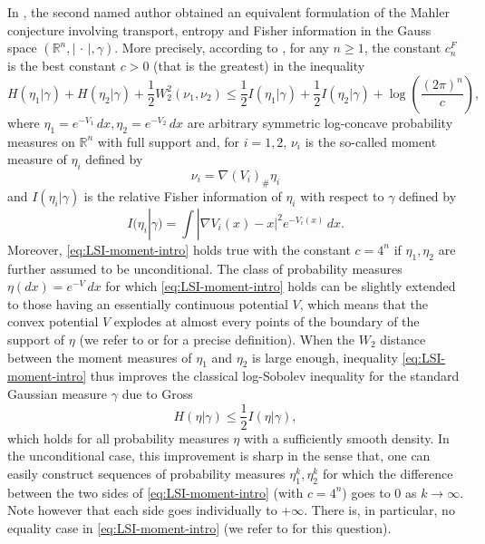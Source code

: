 \documentclass[10pt]{amsart}
\theoremstyle{definition}
\theoremstyle{remark}
\newcommand{\R}{\mathbb{R}}
\begin{document}
In \cite{Gozlan21}, the second named author obtained an equivalent formulation of the Mahler conjecture involving transport, entropy and Fisher information in the Gauss space $(\R^n,|\,\cdot\,|,\gamma)$.
More precisely, according to \cite[Theorem 1.3]{Gozlan21}, for any $n\geq 1$, the constant $c_n^F$ is the best constant $c>0$ (that is the greatest) in the inequality 
\begin{equation}\label{eq:LSI-moment-intro}
H(\eta_1 |\gamma)+ H(\eta_2 |\gamma) + \frac{1}{2}W_2^2(\nu_1,\nu_2) \leq \frac{1}{2} I(\eta_1| \gamma)+ \frac{1}{2} I(\eta_2| \gamma)+  \log \left(\frac{(2\pi)^n}{c}\right),
\end{equation}
where $\eta_1=e^{-V_1}\,dx,\eta_2=e^{-V_2}\,dx$ are arbitrary symmetric log-concave probability measures on $\R^n$ with full support and, for $i=1,2$, $\nu_i$ is the so-called moment measure of $\eta_i$ defined by 
\[
\nu_i = \nabla (V_i)_\# \eta_i
\]
and $I(\eta_i| \gamma)$ is the relative Fisher information of $\eta_i$ with respect to $\gamma$ defined by
\[
I(\eta_i| \gamma)= \int |\nabla V_i(x)-x|^2 e^{-V_i(x)}\,dx.
\]
Moreover, \eqref{eq:LSI-moment-intro} holds true with the constant $c= 4^n$ if $\eta_1,\eta_2$ are further assumed to be unconditional. The class of probability measures $\eta(dx)=e^{-V}\,dx$ for which \eqref{eq:LSI-moment-intro} holds can be slightly extended to those having an essentially continuous potential $V$, which means that the convex potential $V$ explodes at almost every points of the boundary of the support of $\eta$ (we refer to \cite{Gozlan21} or \cite{CEK15} for a precise definition).
When the $W_2$ distance between the moment measures of $\eta_1$ and $\eta_2$ is large enough, inequality \eqref{eq:LSI-moment-intro} thus improves the classical log-Sobolev inequality for the standard Gaussian measure $\gamma$ due to Gross \cite{Gro75}
\begin{equation}\label{eq:LSI-Gross-intro}
H(\eta |\gamma) \leq \frac{1}{2} I(\eta| \gamma),
\end{equation}
which holds for all probability measures $\eta$ with a sufficiently smooth density. In the unconditional case, this improvement is sharp in the sense that, one can easily construct sequences of probability measures $\eta_1^k,\eta_2^k$ for which the difference between the two sides of \eqref{eq:LSI-moment-intro} (with $c=4^n$) goes to $0$ as $k \to \infty$. Note however that each side goes individually to $+\infty$. There is, in particular, no equality case in \eqref{eq:LSI-moment-intro} (we refer to \cite[Remarks 3.9, 3.10 and 3.11]{Gozlan21} for this question).
\end{document}

